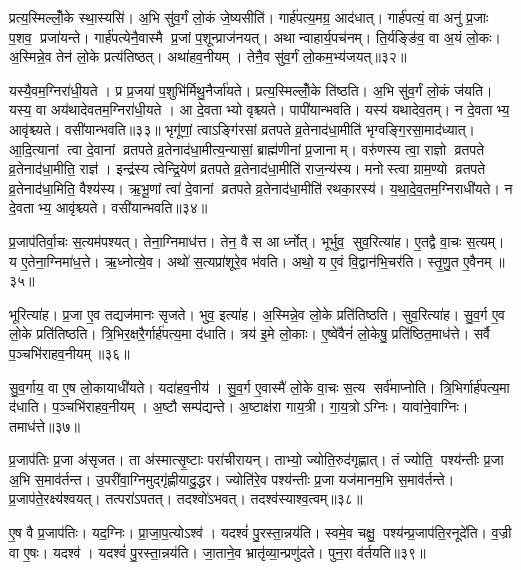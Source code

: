 प्रत्य॒स्मिल्लोँ॒के स्था॒स्यसि॑।
अ॒भि सु॑व॒र्गं लो॒कं जे॒ष्यसीति॑।
गार्\mbox{}ह॑पत्य॒मग्र॒ आद॑धात्।
गार्\mbox{}ह॑पत्यं॒ वा अनु॑ प्र॒जाः प॒शव॒ प्रजा॑यन्ते।
गार्\mbox{}ह॑पत्येनै॒वास्मै प्र॒जां प॒शून्प्राज॑नयत्।
अथान्वाहार्य॒पच॑नम्।
ति॒र्यङ्ङि॑व॒ वा अ॒यं लो॒कः।
अ॒स्मिन्ने॒व तेन॑ लो॒के प्रत्य॑तिष्ठत्।
अथा॑हव॒नीयम्।
तेनै॒व सु॑व॒र्गं लो॒कम॒भ्य॑जयत्॥३२॥

यस्यै॒वम॒ग्निरा॑धी॒यते।
प्र प्र॒जया॑ प॒शुभि॑र्मिथु॒नैर्जा॑यते।
प्रत्य॒स्मिल्लोँ॒के ति॑ष्ठति।
अ॒भि सु॑व॒र्गं लो॒कं ज॑यति।
यस्य॒ वा अय॑थादेवतम॒ग्निरा॑धी॒यते।
आ दे॒वताभ्यो वृश्च्यते।
पापी॑यान्भवति।
यस्य॑ यथादेव॒तम्।
न दे॒वताभ्य॒ आवृ॑श्च्यते।
वसी॑यान्भवति॥३३॥ भृगू॑णां॒ त्वाऽङ्गि॑रसां व्रतपते व्र॒तेनाद॑धा॒मीति॑ भृग्वङ्गि॒रसा॒माद॑ध्यात्।
आ॒दि॒त्यानां त्वा दे॒वानां व्रतपते व्र॒तेनाद॑धा॒मीत्य॒न्यासां॒ ब्राह्म॑णीनां प्र॒जानाम्।
वरु॑णस्य त्वा॒ राज्ञो व्रतपते व्र॒तेनाद॑धा॒मीति॒ राज्ञ॑।
इन्द्र॑स्य त्वेन्द्रि॒येण॑ व्रतपते व्र॒तेनाद॑धा॒मीति॑ राज॒न्य॑स्य।
मनोस्त्वा ग्राम॒ण्यो व्रतपते व्र॒तेनाद॑धा॒मिति॒ वैश्य॑स्य।
ऋ॒भू॒णां त्वा॑ दे॒वानां व्रतपते व्र॒तेनाद॑धा॒मीति॑ रथका॒रस्य॑।
य॒था॒दे॒व॒तम॒ग्निराधी॑यते।
न दे॒वताभ्य॒ आवृ॑श्च्यते।
वसी॑यान्भवति॥३४॥

प्र॒जाप॑तिर्वा॒चः स॒त्यम॑पश्यत्।
तेना॒ग्निमाध॑त्त।
तेन॒ वै स आर्ध्नोत्।
भूर्भुव॒ सुव॒रित्या॑ह।
ए॒तद्वै वा॒चः स॒त्यम्।
य ए॒तेना॒ग्निमा॑ध॒त्ते।
ऋ॒ध्नोत्ये॒व।
अथो॑ स॒त्यप्रा॑शूरे॒व भ॑वति।
अथो॒ य ए॒वं वि॒द्वान॑भि॒चर॑ति।
स्तृ॒णु॒त ए॒वैनम्॥३५॥

भूरित्या॑ह।
प्र॒जा ए॒व तद्यज॑मानः सृजते।
भुव॒ इत्या॑ह।
अ॒स्मिन्ने॒व लो॒के प्रति॑तिष्ठति।
सुव॒रित्या॑ह।
सु॒व॒र्ग ए॒व लो॒के प्रति॑तिष्ठति।
त्रि॒भिर॒क्षरै॒र्गार्\mbox{}ह॑पत्य॒मा द॑धाति।
त्रय॑ इ॒मे लो॒काः।
ए॒ष्वे॑वैनं॑ लो॒केषु॒ प्रति॑ष्ठित॒माध॑त्ते।
सर्वै प॒ञ्चभि॑राहव॒नीयम्॥३६॥

सु॒व॒र्गाय॒ वा ए॒ष लो॒कायाधी॑यते।
यदा॑हव॒नीय॑।
सु॒व॒र्ग ए॒वास्मै॑ लो॒के वा॒चः स॒त्य सर्व॑माप्नोति।
त्रि॒भिर्गार्\mbox{}ह॑पत्य॒मा द॑धाति।
प॒ञ्चभि॑राहव॒नीयम्।
अ॒ष्टौ सम्प॑द्यन्ते।
अ॒ष्टाक्ष॑रा गाय॒त्री।
गा॒य॒त्रोऽग्निः।
यावा॑ने॒वाग्निः।
तमाध॑त्ते॥३७॥

प्र॒जाप॑तिः प्र॒जा अ॑सृजत।
ता अ॑स्मात्सृ॒ष्टाः परा॑चीरायन्।
ताभ्यो॒ ज्योति॒रुद॑गृह्णात्।
तं ज्योति॒ पश्य॑न्तीः प्र॒जा अ॒भि स॒माव॑र्तन्त।
उ॒परी॑वा॒ग्निमुद्गृ॑ह्णीयादु॒द्धर\sn{}।
ज्योति॑रे॒व पश्य॑न्तीः प्र॒जा यज॑मानम॒भि स॒माव॑र्तन्ते।
प्र॒जाप॑ते॒रक्ष्य॑श्वयत्।
तत्परा॑ऽपतत्।
तदश्वो॑ऽभवत्।
तदश्व॑स्याश्व॒त्वम्॥३८॥

ए॒ष वै प्र॒जाप॑तिः।
यद॒ग्निः।
प्रा॒जा॒प॒त्योऽश्व॑।
यदश्वं॑ पु॒रस्ता॒न्नय॑ति।
स्वमे॒व चक्षु॒ पश्य॑न्प्र॒जाप॑ति॒रनूदे॑ति।
व॒ज्री वा ए॒षः।
यदश्व॑।
यदश्वं॑ पु॒रस्ता॒न्नय॑ति।
जा॒ताने॒व भ्रातृ॑व्या॒न्प्रणु॑दते।
पुन॒रा व॑र्तयति॥३९॥

